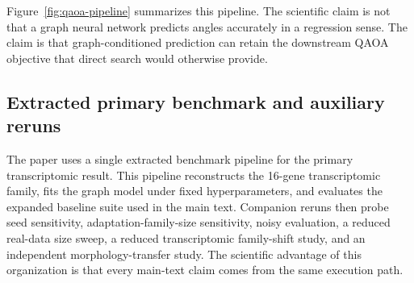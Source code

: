 \documentclass[
  reprint,
  twocolumn,
  aps,
  superscriptaddress,
  longbibliography,
  floatfix
]{revtex4-2}
\begin{document}
Figure~\ref{fig:qaoa-pipeline} summarizes this pipeline. The scientific claim is not that a graph neural network predicts angles accurately in a regression sense. The claim is that graph-conditioned prediction can retain the downstream QAOA objective that direct search would otherwise provide.

\subsection{Extracted primary benchmark and auxiliary reruns}
The paper uses a single extracted benchmark pipeline for the primary transcriptomic result. This pipeline reconstructs the 16-gene transcriptomic family, fits the graph model under fixed hyperparameters, and evaluates the expanded baseline suite used in the main text. Companion reruns then probe seed sensitivity, adaptation-family-size sensitivity, noisy evaluation, a reduced real-data size sweep, a reduced transcriptomic family-shift study, and an independent morphology-transfer study. The scientific advantage of this organization is that every main-text claim comes from the same execution path.
\end{document}

